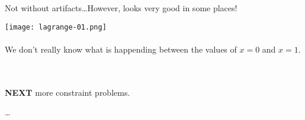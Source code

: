 \documentclass[12pt]{article}
\begin{document}
\newpage

\noindent Not without artifacts\dots However, looks very good in some places!

\texttt{[image: lagrange-01.png]} \\ \\
We don't really know what is happending between the values of $x = 0$ and $x = 1$.  \\
 \\ \\
\textbf{NEXT} more constraint problems.  

\newpage  

\begin{thebibliography}{}

\item \dots 

\end{thebibliography}
\end{document}
